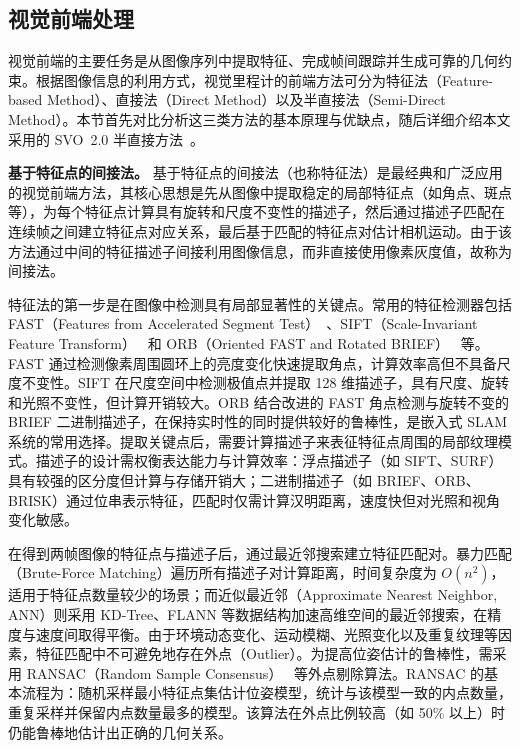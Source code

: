 \subsection{视觉前端处理}

视觉前端的主要任务是从图像序列中提取特征、完成帧间跟踪并生成可靠的几何约束。根据图像信息的利用方式，视觉里程计的前端方法可分为特征法（Feature-based Method）、直接法（Direct Method）以及半直接法（Semi-Direct Method）。本节首先对比分析这三类方法的基本原理与优缺点，随后详细介绍本文采用的 SVO~2.0 半直接方法~\cite{forster2017svo}。

\textbf{基于特征点的间接法。}
基于特征点的间接法（也称特征法）是最经典和广泛应用的视觉前端方法，其核心思想是先从图像中提取稳定的局部特征点（如角点、斑点等），为每个特征点计算具有旋转和尺度不变性的描述子，然后通过描述子匹配在连续帧之间建立特征点对应关系，最后基于匹配的特征点对估计相机运动。由于该方法通过中间的特征描述子间接利用图像信息，而非直接使用像素灰度值，故称为间接法。

特征法的第一步是在图像中检测具有局部显著性的关键点。常用的特征检测器包括 FAST（Features from Accelerated Segment Test）~\cite{rosten2006machine}、SIFT（Scale-Invariant Feature Transform）~\cite{lowe2004distinctive} 和 ORB（Oriented FAST and Rotated BRIEF）~\cite{rublee2011orb} 等。FAST 通过检测像素周围圆环上的亮度变化快速提取角点，计算效率高但不具备尺度不变性。SIFT 在尺度空间中检测极值点并提取 128 维描述子，具有尺度、旋转和光照不变性，但计算开销较大。ORB 结合改进的 FAST 角点检测与旋转不变的 BRIEF 二进制描述子，在保持实时性的同时提供较好的鲁棒性，是嵌入式 SLAM 系统的常用选择。提取关键点后，需要计算描述子来表征特征点周围的局部纹理模式。描述子的设计需权衡表达能力与计算效率：浮点描述子（如 SIFT、SURF）具有较强的区分度但计算与存储开销大；二进制描述子（如 BRIEF、ORB、BRISK）通过位串表示特征，匹配时仅需计算汉明距离，速度快但对光照和视角变化敏感。

在得到两帧图像的特征点与描述子后，通过最近邻搜索建立特征匹配对。暴力匹配（Brute-Force Matching）遍历所有描述子对计算距离，时间复杂度为 $O(n^2)$，适用于特征点数量较少的场景；而近似最近邻（Approximate Nearest Neighbor, ANN）则采用 KD-Tree、FLANN 等数据结构加速高维空间的最近邻搜索，在精度与速度间取得平衡。由于环境动态变化、运动模糊、光照变化以及重复纹理等因素，特征匹配中不可避免地存在外点（Outlier）。为提高位姿估计的鲁棒性，需采用 RANSAC（Random Sample Consensus）~\cite{fischler1981random} 等外点剔除算法。RANSAC 的基本流程为：随机采样最小特征点集估计位姿模型，统计与该模型一致的内点数量，重复采样并保留内点数量最多的模型。该算法在外点比例较高（如 50\% 以上）时仍能鲁棒地估计出正确的几何关系。

